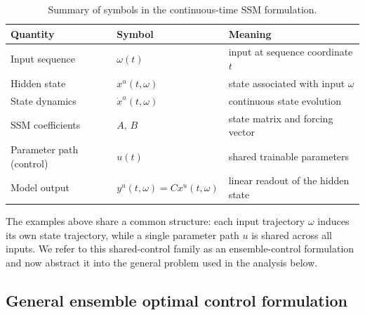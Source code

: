 \documentclass[11pt]{amsart}
\numberwithin{equation}{section} %
\theoremstyle{remark}
\begin{document}
\begin{table}[ht]
\centering
\caption{Summary of symbols in the continuous-time SSM formulation.}
\label{tab:ssm_mapping}
\begin{tabular}{@{}lll@{}}
\toprule
\textbf{Quantity} & \textbf{Symbol} & \textbf{Meaning} \\
\midrule
Input sequence & $\omega(t)$ & input at sequence coordinate $t$ \\
Hidden state & $x^u(t,\omega)$ & state associated with input $\omega$ \\
State dynamics & $\dot x^u(t,\omega)$ & continuous state evolution \\
SSM coefficients & $A,\,B$ & state matrix and forcing vector \\
Parameter path (control) & $u(t)$ & shared trainable parameters \\
Model output & $y^u(t,\omega)=Cx^u(t,\omega)$ & linear readout of the hidden state \\
\bottomrule
\end{tabular}
\end{table}

The examples above share a common structure: each input trajectory $\omega$ induces its own state trajectory, while a single parameter path $u$ is shared across all inputs. We refer to this shared-control family as an ensemble-control formulation and now abstract it into the general problem used in the analysis below.

\subsection{General ensemble optimal control formulation}\label{subsec:general_ensemble_control}
\end{document}
